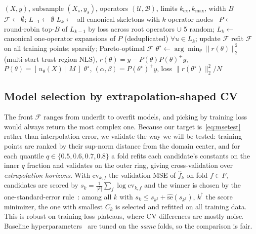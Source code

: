 \documentclass{article}
\begin{document}
\begin{algorithm}[!tb]
\caption{Complexity-ordered skeleton search; both loops stop once
$\min \mathcal{F} < 10^{-10}\,\mathrm{Var}(y)$.}
\label{alg:search}
\footnotesize
\begin{algorithmic}[1]
\Require $(X,y)$, subsample $(X_s,y_s)$, operators $(\mathcal{U},\mathcal{B})$, limits $k_{\mathrm{ex}},k_{\max}$, width $B$
\State $\mathcal{F} \gets \emptyset$; \quad $L_{-1} \gets \emptyset$ 
   $L_k \gets$ all canonical skeletons with $k$ operator nodes 
  \Else\ $P \gets$ round-robin top-$B$ of $L_{k-1}$ by loss across root operators $\cup$ 5 random;
  \State \quad $L_k \gets$ canonical one-operator expansions of $P$ (deduplicated) 
  \EndIf
  \State {} $\forall u \in L_k$; update $\mathcal{F}$
\EndFor
\State refit $\mathcal{F}$ on all training points; sparsify; \Return Pareto-optimal $\mathcal{F}$
  \State $\theta^\star \gets \arg\min_\theta \lVert r(\theta)\rVert_2^2$ (multi-start trust-region NLS), $r(\theta) = y - P(\theta)P(\theta)^{+}y$, $P(\theta) = [\,u_\theta(X)\mid M\,]$
  \State \Return $\theta^\star$, $(\alpha,\beta) = P(\theta^\star)^{+}y$, loss $\lVert r(\theta^\star)\rVert_2^2/N$
\EndProcedure
\end{algorithmic}
\end{algorithm}

\subsection{Model selection by extrapolation-shaped CV}
\label{sec:selection}

The front $\mathcal{F}$ ranges from underfit to overfit models, and picking by
training loss would always return the most complex one. Because our target
is~\eqref{eq:msetest} rather than interpolation error, we validate the way we
will be tested: training points are ranked by their sup-norm distance from the
domain center, and for each quantile $q \in \{0.5, 0.6, 0.7, 0.8\}$ a fold
refits each candidate's constants on the inner $q$ fraction and validates on the
outer ring, giving cross-validation over \emph{extrapolation horizons}. With
$\mathrm{cv}_{k,f}$ the validation MSE of $\hat f_k$ on fold $f \in F$,
candidates are scored by $s_k = \tfrac{1}{|F|}\sum_f \log \mathrm{cv}_{k,f}$ and
the winner is chosen by the one-standard-error rule~\citep[\S7.10.1]{ESL}: among
all $k$ with $s_k \le s_{k^\dagger} + \widehat{\mathrm{se}}(s_{k^\dagger})$,
$k^\dagger$ the score minimizer, the one with smallest $C_k$ is selected and
refitted on all training data. This is robust on training-loss plateaus, where
CV differences are mostly noise. Baseline hyperparameters~\citep[Ch.~3, 11,
15]{ESL} are tuned on the \emph{same} folds, so the comparison is fair.
\end{document}
